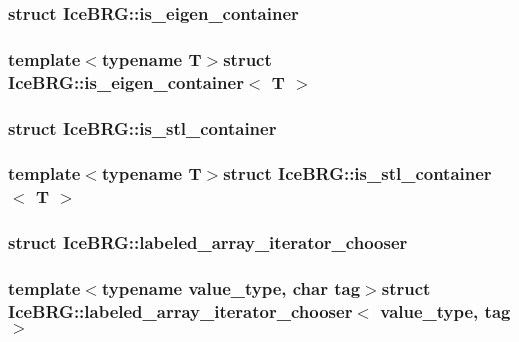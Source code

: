 \label{structIceBRG_1_1is__eigen__container}
\hypertarget{namespaceIceBRG_structIceBRG_1_1is__eigen__container}{}
\subsubsection{struct Ice\-B\-R\-G\-:\-:is\-\_\-eigen\-\_\-container}
\subsubsection*{template$<$typename T$>$struct Ice\-B\-R\-G\-::is\-\_\-eigen\-\_\-container$<$ T $>$}

\label{structIceBRG_1_1is__stl__container}
\hypertarget{namespaceIceBRG_structIceBRG_1_1is__stl__container}{}
\subsubsection{struct Ice\-B\-R\-G\-:\-:is\-\_\-stl\-\_\-container}
\subsubsection*{template$<$typename T$>$struct Ice\-B\-R\-G\-::is\-\_\-stl\-\_\-container$<$ T $>$}

\label{structIceBRG_1_1labeled__array__iterator__chooser}
\hypertarget{namespaceIceBRG_structIceBRG_1_1labeled__array__iterator__chooser}{}
\subsubsection{struct Ice\-B\-R\-G\-:\-:labeled\-\_\-array\-\_\-iterator\-\_\-chooser}
\subsubsection*{template$<$typename value\-\_\-type, char tag$>$struct Ice\-B\-R\-G\-::labeled\-\_\-array\-\_\-iterator\-\_\-chooser$<$ value\-\_\-type, tag $>$}



